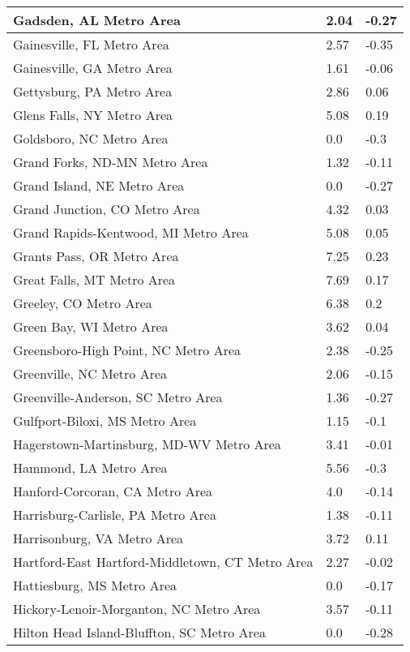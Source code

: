 \documentclass[12pt,oneside, letterpaper]{book}
\begin{document}
\begin{longtable}{| p{} | p{} | p{} |}
    Gadsden, AL Metro Area & 2.04 & -0.27 \\ \hline
    Gainesville, FL Metro Area & 2.57 & -0.35 \\ \hline
    Gainesville, GA Metro Area & 1.61 & -0.06 \\ \hline
    Gettysburg, PA Metro Area & 2.86 & 0.06 \\ \hline
    Glens Falls, NY Metro Area & 5.08 & 0.19 \\ \hline
    Goldsboro, NC Metro Area & 0.0 & -0.3 \\ \hline
    Grand Forks, ND-MN Metro Area & 1.32 & -0.11 \\ \hline
    Grand Island, NE Metro Area & 0.0 & -0.27 \\ \hline
    Grand Junction, CO Metro Area & 4.32 & 0.03 \\ \hline
    Grand Rapids-Kentwood, MI Metro Area & 5.08 & 0.05 \\ \hline
    Grants Pass, OR Metro Area & 7.25 & 0.23 \\ \hline
    Great Falls, MT Metro Area & 7.69 & 0.17 \\ \hline
    Greeley, CO Metro Area & 6.38 & 0.2 \\ \hline
    Green Bay, WI Metro Area & 3.62 & 0.04 \\ \hline
    Greensboro-High Point, NC Metro Area & 2.38 & -0.25 \\ \hline
    Greenville, NC Metro Area & 2.06 & -0.15 \\ \hline
    Greenville-Anderson, SC Metro Area & 1.36 & -0.27 \\ \hline
    Gulfport-Biloxi, MS Metro Area & 1.15 & -0.1 \\ \hline
    Hagerstown-Martinsburg, MD-WV Metro Area & 3.41 & -0.01 \\ \hline
    Hammond, LA Metro Area & 5.56 & -0.3 \\ \hline
    Hanford-Corcoran, CA Metro Area & 4.0 & -0.14 \\ \hline
    Harrisburg-Carlisle, PA Metro Area & 1.38 & -0.11 \\ \hline
    Harrisonburg, VA Metro Area & 3.72 & 0.11 \\ \hline
    Hartford-East Hartford-Middletown, CT Metro Area & 2.27 & -0.02 \\ \hline
    Hattiesburg, MS Metro Area & 0.0 & -0.17 \\ \hline
    Hickory-Lenoir-Morganton, NC Metro Area & 3.57 & -0.11 \\ \hline
    Hilton Head Island-Bluffton, SC Metro Area & 0.0 & -0.28 \\ \hline

\end{longtable}
\end{document}
